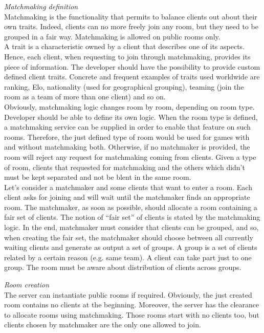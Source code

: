 \bigskip
\textit{Matchmaking definition}
\\
Matchmaking is the functionality that permits to balance clients out about their own traits. Indeed, clients can no more freely join any room, but they need to be grouped in a fair way. Matchmaking is allowed on public rooms only.   
\\
A trait is a characteristic owned by a client that describes one of its aspects. Hence, each client, when requesting to join through matchmaking, provides its piece of information. The developer should have the possibility to provide custom defined client traits. Concrete and frequent examples of traits used worldwide are ranking, Elo, nationality (used for geographical grouping), teaming (join the room as a team of more than one client) and so on.
\\
Obviously, matchmaking logic changes room by room, depending on room type. Developer should be able to define its own logic.
When the room type is defined, a matchmaking service can be supplied in order to enable that feature on such rooms. Therefore, the just defined type of room would be used for games with and without matchmaking both. Otherwise, if no matchmaker is provided, the room will reject any request for matchmaking coming from clients.
Given a type of room, clients that requested for matchmaking and the others which didn't must be kept separated and not be blent in the same room.
\\
Let's consider a matchmaker and some clients that want to enter a room. Each client asks for joining and will wait until the matchmaker finds an appropriate room. The matchmaker, as soon as possible, should allocate a room containing a fair set of clients. The notion of ``fair set'' of clients is stated by the matchmaking logic. In the end, matchmaker must consider that clients can be grouped, and so, when creating the fair set, the matchmaker should choose between all currently waiting clients and generate as output a set of groups. A group is a set of clients related by a certain reason (e.g. same team). A client can take part just to one group. The room must be aware about distribution of clients across groups.

\bigskip
\textit{Room creation}
\\
The server can instantiate public rooms if required. Obviously, the just created room contains no clients at the beginning.
Moreover, the server has the clearance to allocate rooms using matchmaking. Those rooms start with no clients too, but clients chosen by matchmaker are the only one allowed to join.

